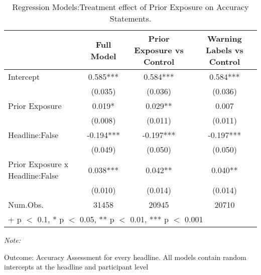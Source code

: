 \begin{table}

\caption{Regression Models:Treatment effect of Prior Exposure on Accuracy Statements.}
\centering
\begin{threeparttable}
\begin{tabular}[t]{lccc}
\toprule
  & Full Model & Prior Exposure vs Control & Warning Labels vs Control\\
\midrule
Intercept & 0.585*** & 0.584*** & 0.584***\\
 & (0.035) & (0.036) & (0.036)\\
Prior Exposure & 0.019* & 0.029** & 0.007\\
 & (0.008) & (0.011) & (0.011)\\
Headline:False & -0.194*** & -0.197*** & -0.197***\\
 & (0.049) & (0.050) & (0.050)\\
Prior Exposure x Headline:False & 0.038*** & 0.042** & 0.040**\\
 & (0.010) & (0.014) & (0.014)\\
\midrule
Num.Obs. & 31458 & 20945 & 20710\\
\bottomrule
\multicolumn{4}{l}{\rule{0pt}{1em}+ p $<$ 0.1, * p $<$ 0.05, ** p $<$ 0.01, *** p $<$ 0.001}\\
\end{tabular}
\begin{tablenotes}
\item \textit{Note: } 
\item Outcome: Accuracy Assessment for every headline. All models contain random intercepts at the headline and participant level
\end{tablenotes}
\end{threeparttable}
\end{table}
